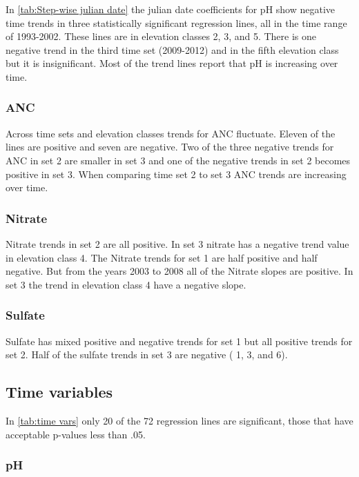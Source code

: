 In \autoref{tab:Step-wise julian date} the julian date coefficients for pH show negative time trends in three statistically significant regression lines, all in the time range of 1993-2002.  These lines are in elevation classes 2, 3, and 5.  There is one negative trend in the third time set (2009-2012) and in the fifth elevation class but it is insignificant.   Most of the trend lines report that pH is increasing over time.

\subsubsection{ANC}

Across time sets and elevation classes trends for ANC fluctuate.  Eleven of the lines are positive and seven are negative.   Two of the three negative trends for ANC in set 2 are smaller in set 3 and one of the negative trends in set 2 becomes positive in set 3.  When comparing time set 2 to set 3 ANC trends are increasing over time. 

\subsubsection{Nitrate}

Nitrate trends in set 2 are all positive.  In set 3 nitrate has a negative trend value in elevation class 4.  The Nitrate trends for set 1 are half positive and half negative.  But from the years 2003 to 2008 all of the Nitrate slopes are positive.  In set 3 the trend in elevation class 4  have a negative slope. 

\subsubsection{Sulfate}

 Sulfate has mixed positive and negative trends for set 1 but all positive trends for set 2.   Half of the sulfate trends in set 3 are negative ( 1, 3, and 6).

\subsection{Time variables}

In \autoref{tab:time vars} only 20 of the 72 regression lines are significant, those that have acceptable p-values less than .05. 

\subsubsection{pH}

